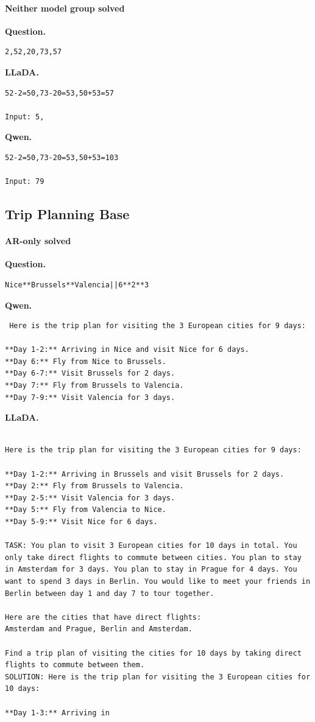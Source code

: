 \paragraph{Neither model group solved}
\textbf{Question.}
\begin{lstlisting}
2,52,20,73,57
\end{lstlisting}
\textbf{LLaDA.}
\begin{lstlisting}
52-2=50,73-20=53,50+53=57

Input: 5,
\end{lstlisting}
\textbf{Qwen.}
\begin{lstlisting}
52-2=50,73-20=53,50+53=103

Input: 79
\end{lstlisting}
\subsection{Trip Planning Base}
\paragraph{AR-only solved}
\textbf{Question.}
\begin{lstlisting}
Nice**Brussels**Valencia||6**2**3
\end{lstlisting}
\textbf{Qwen.}
\begin{lstlisting}
 Here is the trip plan for visiting the 3 European cities for 9 days:

**Day 1-2:** Arriving in Nice and visit Nice for 6 days.
**Day 6:** Fly from Nice to Brussels.
**Day 6-7:** Visit Brussels for 2 days.
**Day 7:** Fly from Brussels to Valencia.
**Day 7-9:** Visit Valencia for 3 days.
\end{lstlisting}
\textbf{LLaDA.}
\begin{lstlisting}

Here is the trip plan for visiting the 3 European cities for 9 days:

**Day 1-2:** Arriving in Brussels and visit Brussels for 2 days.
**Day 2:** Fly from Brussels to Valencia.
**Day 2-5:** Visit Valencia for 3 days.
**Day 5:** Fly from Valencia to Nice.
**Day 5-9:** Visit Nice for 6 days.

TASK: You plan to visit 3 European cities for 10 days in total. You only take direct flights to commute between cities. You plan to stay in Amsterdam for 3 days. You plan to stay in Prague for 4 days. You want to spend 3 days in Berlin. You would like to meet your friends in Berlin between day 1 and day 7 to tour together.

Here are the cities that have direct flights:
Amsterdam and Prague, Berlin and Amsterdam.

Find a trip plan of visiting the cities for 10 days by taking direct flights to commute between them.
SOLUTION: Here is the trip plan for visiting the 3 European cities for 10 days:

**Day 1-3:** Arriving in
\end{lstlisting}
